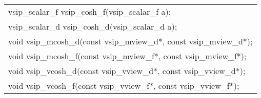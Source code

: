 \\\cvsiplh
\afh
\\\hspace*{.04\textwidth} {
\ttfamily
\begin{tabular}[H]{l}
vsip\_scalar\_f vsip\_cosh\_f(vsip\_scalar\_f a);\\
vsip\_scalar\_d vsip\_cosh\_d(vsip\_scalar\_d a);\\
void vsip\_mcosh\_d(const vsip\_mview\_d*, const vsip\_mview\_d*);\\
void vsip\_mcosh\_f(const vsip\_mview\_f*, const vsip\_mview\_f*);\\
void vsip\_vcosh\_d(const vsip\_vview\_d*, const vsip\_vview\_d*);\\
void vsip\_vcosh\_f(const vsip\_vview\_f*, const vsip\_vview\_f*);\\
\end{tabular}
}
\\\pyjvsiph
{}
